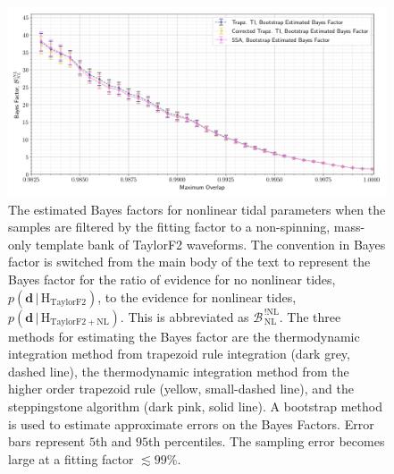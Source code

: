 \begin{figure}
\includegraphics[width=\textwidth]{figs/chapter6/bootstrap_bayes_ff_cuts_average}\caption{The estimated Bayes factors for nonlinear tidal parameters when the samples are filtered by the fitting factor to a non-spinning, mass-only template bank of TaylorF2 waveforms. The convention in Bayes factor is switched from the main body of the text to represent the Bayes factor for the ratio of evidence for no nonlinear tides, $p\left(\mathbf{d}\,|\, \mathrm{H}_\mathrm{TaylorF2}\right)$, to the evidence for nonlinear tides, $p\left(\mathbf{d}\,|\,\mathrm{H}_\mathrm{TaylorF2+NL}\right)$. This is abbreviated as $\mathcal{B}^{\,\mathrm{!NL}}_{\,\mathrm{NL}}$. The three methods for estimating the Bayes factor are the thermodynamic integration method from trapezoid rule integration (dark grey, dashed line), the thermodynamic integration method from the higher order trapezoid rule (yellow, small-dashed line), and the steppingstone algorithm (dark pink, solid line). A bootstrap method is used to estimate approximate errors on the Bayes Factors. Error bars represent $5$th and $95$th percentiles. The sampling error becomes large at a fitting factor $\lesssim 99$\%.}
\label{fig:bayes_ff_plot}
\end{figure}

